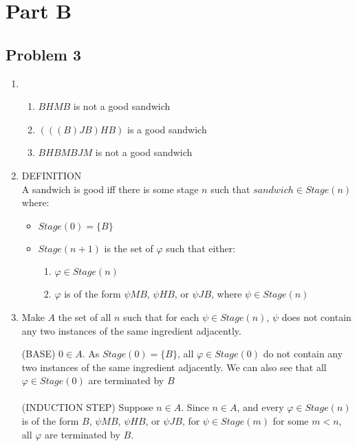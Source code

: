\documentclass[a4paper]{article}
\newcommand{\SET}[1]{\{ {#1} \}}
\begin{document}
\section*{Part B}

\subsection*{Problem 3}

\begin{enumerate}
    \item \begin{enumerate}
        \item $BHMB$ is not a good sandwich
        \item $(((B)JB)HB)$ is a good sandwich
        \item $BHBMBJM$ is not a good sandwich
    
    \end{enumerate}

    \item \uppercase{Definition}\\
    A sandwich is good iff there is some stage $n$ such that $sandwich \in Stage(n)$ where:

    \begin{itemize}
        \item $Stage(0) = \{ B \}$
        \item $Stage(n + 1)$ is the set of $\varphi$ such that either:
        \begin{enumerate}
            \item $\varphi \in Stage(n)$
            \item $\varphi$ is of the form $\psi MB$, $\psi HB$, or $\psi JB$, where $\psi \in Stage(n)$
        \end{enumerate}
    \end{itemize}

    \item Make $A$ the set of all $n$ such that for each $\psi \in Stage(n)$, $\psi$ does not contain any two instances of the same ingredient adjacently.

    \uppercase{(BASE)} $0 \in A$. As $Stage(0) = \SET{B}$, all $\varphi \in Stage(0)$ do not contain any two instances of the same ingredient adjacently. We can also see that all $\varphi \in Stage(0)$ are terminated by $B$\\\\
    \uppercase{(INDUCTION STEP)} Suppose $n \in A$.  Since $n \in A$, and every $\varphi \in Stage(n)$ is of the form $B$, $\psi MB$, $\psi HB$, or $\psi JB$, for $\psi \in Stage(m)$ for some $m < n$, all $\varphi$ are terminated by $B$.


\end{enumerate}
\end{document}
